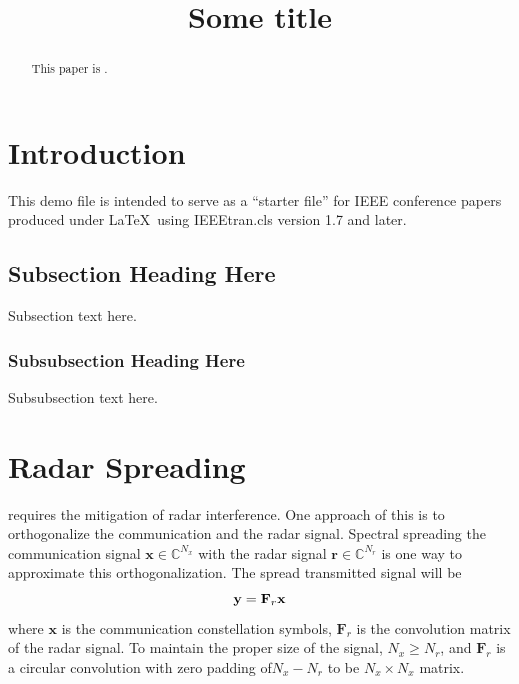 \documentclass[conference]{IEEEtran}
\begin{document}
\title{Some title}

\author{
}
\maketitle

\begin{abstract}
This paper is .
\end{abstract}

\section{Introduction}
This demo file is intended to serve as a ``starter file''
for IEEE conference papers produced under \LaTeX\ using
IEEEtran.cls version 1.7 and later.

\subsection{Subsection Heading Here}
Subsection text here.


\subsubsection{Subsubsection Heading Here}
Subsubsection text here.


\section{Radar Spreading}
\SSPARC requires the mitigation of radar interference. One approach of this is to orthogonalize the communication and the radar signal.  Spectral spreading the communication signal ${\mathbf{x}\in \mathbb{C}^{N_x}}$ with the radar signal $\mathbf{r}\in \mathbb{C}^{N_r}$ is one way to approximate this orthogonalization.  The spread transmitted signal will be
\begin{equation}
\mathbf{y}=\mathbf{F}_r \mathbf{x}\\
\label{eq1}
\end{equation}  
where $\mathbf{x}$ is the communication constellation symbols, $\mathbf{F}_r$ is the convolution matrix of the radar signal.  To maintain the proper size of the signal, $N_x\geq N_r$, and $\mathbf{F}_r$ is a circular convolution with zero padding of$N_x-N_r$ to be $N_x\times N_x$ matrix.
\end{document}

